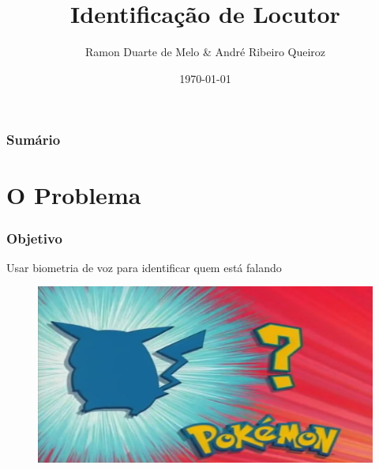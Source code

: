 \documentclass{beamer}
\title[Identificação de Locutor]{Identificação de Locutor} %
\author{Ramon Duarte de Melo \& André Ribeiro Queiroz} %
\institute[UFRJ] %
{
    Universidade Federal do Rio de Janeiro \\ %
    \medskip
    \textit{ramonduarte@poli.ufrj.br \& handre\_queiroz@poli.ufrj.br} %
}
\date{\today} %
\begin{document}
\begin{frame} %
    \titlepage %
\end{frame}

\begin{frame} %
    \frametitle{Sumário} %
    \tableofcontents 
\end{frame}


\section{O Problema} 

\begin{frame} %
    \frametitle{Objetivo}
    
    Usar biometria de voz para identificar quem está falando

    \begin{figure}[]
        \centering
        \includegraphics[width=\linewidth]{fig1.jpg}
    \end{figure}
\end{frame}
\end{document}
